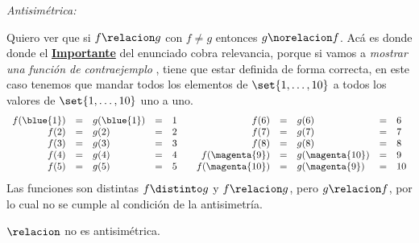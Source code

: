 \begin{enumerate}[label=\roman*)]
        \textit{Antisimétrica:} \par
        Quiero ver que si $f \relacion g$ con $f\neq g$ entonces $g\norelacion f$. Acá es donde donde el \textbf{\underline{Importante}} del enunciado
        cobra relevancia, porque si vamos a \textit{mostrar una función de contraejemplo }, tiene que estar definida de forma correcta, en este
        caso tenemos que mandar todos los elementos de $\set{1,\dots,10}$ a todos los valores de $\set{1,\dots,10}$ uno a uno.
        $$
          \begin{array}{rclrl}
            f(\blue{1}) & = & g(\blue{1}) & = & 1 \\
            f(2)        & = & g(2)        & = & 2 \\
            f(3)        & = & g(3)        & = & 3 \\
            f(4)        & = & g(4)        & = & 4 \\
            f(5)        & = & g(5)        & = & 5
          \end{array} \quad
          \begin{array}{rclcl}
            f(6)            & = & g(6)            & = & 6  \\
            f(7)            & = & g(7)            & = & 7  \\
            f(8)            & = & g(8)            & = & 8  \\
            f(\magenta{9})  & = & g(\magenta{10}) & = & 9  \\
            f(\magenta{10}) & = & g(\magenta{9})  & = & 10
          \end{array}
        $$
        Las funciones son distintas $f \distinto g$ y $f \relacion g$, pero $g \relacion f$, por lo cual no se cumple al condición de la antisimetría.\par
        $\relacion$ no es antisimétrica.


\end{enumerate}
